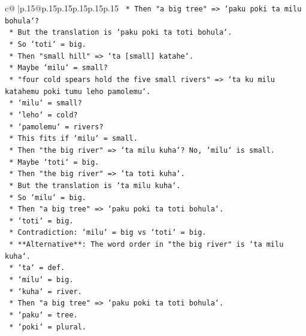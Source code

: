 \documentclass{article}
\begin{document}
{\begin{supertabular}{c@{$\;$}|p{.15\linewidth}@{}p{.15\linewidth}p{.15\linewidth}p{.15\linewidth}p{.15\linewidth}p{.15\linewidth}}
{{{\texttt{                *   Then "a big tree" => `paku poki ta milu bohula`?} \\
\texttt{                *   But the translation is `paku poki ta toti bohula`.} \\
\texttt{                *   So `toti` = big.} \\
\texttt{                *   Then "small hill" => `ta {[}small{]} katahe`.} \\
\texttt{                *   Maybe `milu` = small?} \\
\texttt{                *   "four cold spears hold the five small rivers" => `ta ku milu katahemu poki tumu leho pamolemu`.} \\
\texttt{                    *   `milu` = small?} \\
\texttt{                    *   `leho` = cold?} \\
\texttt{                    *   `pamolemu` = rivers?} \\
\texttt{                *   This fits if `milu` = small.} \\
\texttt{                *   Then "the big river" => `ta milu kuha`? No, `milu` is small.} \\
\texttt{                *   Maybe `toti` = big.} \\
\texttt{                *   Then "the big river" => `ta toti kuha`.} \\
\texttt{                *   But the translation is `ta milu kuha`.} \\
\texttt{                *   So `milu` = big.} \\
\texttt{                *   Then "a big tree" => `paku poki ta toti bohula`.} \\
\texttt{                    *   `toti` = big.} \\
\texttt{                    *   Contradiction: `milu` = big vs `toti` = big.} \\
\texttt{    *   **Alternative**: The word order in "the big river" is `ta milu kuha`.} \\
\texttt{        *   `ta` = def.} \\
\texttt{        *   `milu` = big.} \\
\texttt{        *   `kuha` = river.} \\
\texttt{        *   Then "a big tree" => `paku poki ta toti bohula`.} \\
\texttt{            *   `paku` = tree.} \\
\texttt{            *   `poki` = plural.} \\
}}}
\end{supertabular}}
\end{document}
